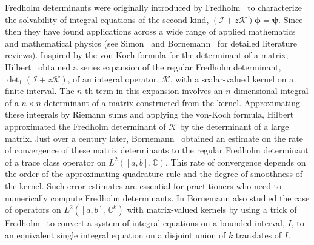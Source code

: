\documentclass{birkjour}
\theoremstyle{definition}
\theoremstyle{remark}
\numberwithin{equation}{section}
\begin{document}
Fredholm determinants
were originally  introduced by Fredholm~\cite{Fred1903} to characterize the 
solvability of integral equations of the second kind, 
$(\mathcal I + z \mathcal K) \boldsymbol \phi = \boldsymbol \psi$.
Since then they have found applications across a wide range 
of applied mathematics and mathematical physics (see 
Simon~\cite{Simon} and Bornemann~\cite{Bornemann} for detailed
literature reviews). 
Inspired by the von-Koch formula for the determinant of a matrix,
Hilbert~\cite{hilbert1904grundzuge} obtained a series expansion of the regular
Fredholm determinant, $\operatorname{det}_1(\mathcal I + z \mathcal K)$,
 of an integral operator, $\mathcal K$, with  a scalar-valued 
kernel on a finite interval. The $n$-th term in this  expansion  
involves an $n$-dimensional integral of a $n\times n$ determinant
of a matrix constructed from the kernel.  Approximating these
integrals by Riemann sums and applying the von-Koch formula,
Hilbert approximated the  Fredholm determinant of $\mathcal K$
by the determinant of a large matrix. Just over  a century later, 
Bornemann~\cite{Bornemann} obtained an estimate
on the rate of convergence of these matrix determinants
to the regular Fredholm determinant of a trace class operator on $L^2([a,b],\mathbb C)$. 
This rate of convergence depends on the order of the approximating quadrature rule 
and the degree of smoothness of the kernel.
Such error estimates are essential for practitioners who need to numerically compute 
Fredholm determinants. 
In \cite[Section~8]{Bornemann} Bornemann also studied the case of operators
on $L^2([a,b],\mathbb C^k)$ with matrix-valued kernels by using a trick of
Fredholm~\cite{Fred1903} to convert a system
of integral equations on a bounded interval, $I$, to an equivalent single integral equation
on a disjoint union of $k$ translates of $I$. 
\end{document}
